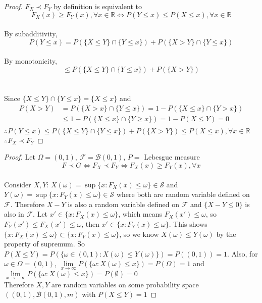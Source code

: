 \documentclass[10pt]{article}
\newenvironment{problem}[2][Problem]{\begin{trivlist}
\item[\hskip \labelsep {\bfseries #1}\hskip \labelsep {\bfseries #2.}]}{\end{trivlist}}
\begin{document}
\begin{problem}{4(a)}
\end{problem}

\begin{proof}
$F_{X} \prec F_{Y}$ by definition is equivalent to $$F_{X}(x) \ge F_{Y}(x), \forall x \in \mathbb{R} \iff P(Y \le x) \le P(X \le x), \forall x \in \mathbb{R}$$\\
By subadditivity, $$P(Y \le x) = P(\{X \le Y\} \cap \{Y \le x\}) + P(\{X > Y\} \cap \{Y \le x\})$$ \\
By monotonicity, $$\le P(\{X \le Y\} \cap \{Y \le x\}) + P(\{X > Y\})$$\\
\\
Since $\{X \le Y\} \cap \{Y \le x\} = \{X \le x\}$ and 
\begin{equation}
\begin{split}
P(X > Y) &= P(\{X > x\} \cap \{Y \le x\}) = 1 - P(\{X \le x\} \cap \{Y > x\}) \\
& \le 1 - P(\{X \le x\} \cap \{Y \ge x\}) = 1 - P(X\le Y) = 0\\
\end{split}
\end{equation}
$\therefore P(Y \le x) \le P(\{X \le Y\} \cap \{Y \le x\}) + P(\{X > Y\}) \le P(X \le x), \forall x \in \mathbb{R}$\\
$\therefore F_{X} \prec F_{Y}$
\end{proof}



\begin{problem}{4(b)}
\end{problem}
 
\begin{proof}
Let  $\Omega = (0,1)$, $\mathcal{F} = \mathcal{B}(0,1)$, $P =$ Lebesgue measure\\
$$F \prec G \iff F_{X} \prec F_{Y} \iff F_{X}(x) \ge F_{Y}(x), \forall x$$\\
Consider $X,Y$: $X(\omega) =\sup\{x: F_{X}(x) \le \omega\} \in \mathcal{S}$ and
$Y(\omega) =\sup\{x: F_{Y}(x) \le \omega\} \in \mathcal{S}$ where both are random variable defined on $\mathcal{F}$. Therefore $X-Y$ is also a random variable defined on $\mathcal{F}$ and $\{X-Y\le 0\}$ is also in $\mathcal{F}$.
Let $x' \in  \{x: F_{X}(x) \le \omega\}$, which means $F_{X}(x') \le \omega$, so $F_{Y}(x') \le F_{X}(x') \le \omega$, then $x' \in  \{x: F_{Y}(x) \le \omega\}$.
This shows $\{x: F_{X}(x) \le \omega\} \subset \{x: F_{Y}(x) \le \omega\}$, so we know $X(\omega) \le Y(\omega)$ by the property of supremum. So $P(X\le Y) = P(\{\omega \in(0,1): X(\omega) \le Y(\omega)\}) = P((0,1)) = 1$.
Also, for $\omega \in \Omega = (0,1)$, $\lim\limits_{x\rightarrow \infty}P(\{\omega: X(\omega) \le x\}) = P(\Omega) = 1$
and $\lim\limits_{x\rightarrow -\infty}P(\{\omega: X(\omega) \le x\}) = P(\emptyset) = 0$\\
Therefore $X,Y$ are random variables on some probability space $((0,1), \mathcal{B}(0,1), m)$ with $P(X \le Y) = 1$
\end{proof}
\end{document}

